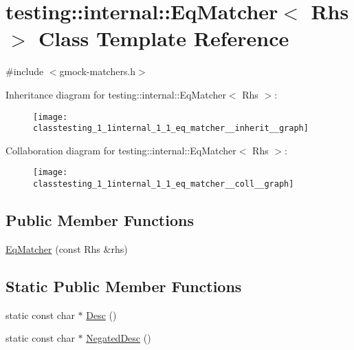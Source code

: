 \hypertarget{classtesting_1_1internal_1_1_eq_matcher}{}\section{testing\+:\+:internal\+:\+:Eq\+Matcher$<$ Rhs $>$ Class Template Reference}
\label{classtesting_1_1internal_1_1_eq_matcher}


{\ttfamily \#include $<$gmock-\/matchers.\+h$>$}



Inheritance diagram for testing\+:\+:internal\+:\+:Eq\+Matcher$<$ Rhs $>$\+:
\nopagebreak
\begin{figure}[H]
\begin{center}
\leavevmode
\texttt{[image: classtesting\_1\_1internal\_1\_1\_eq\_matcher\_\_inherit\_\_graph]}
\end{center}
\end{figure}


Collaboration diagram for testing\+:\+:internal\+:\+:Eq\+Matcher$<$ Rhs $>$\+:
\nopagebreak
\begin{figure}[H]
\begin{center}
\leavevmode
\texttt{[image: classtesting\_1\_1internal\_1\_1\_eq\_matcher\_\_coll\_\_graph]}
\end{center}
\end{figure}
\subsection*{Public Member Functions}
\begin{DoxyCompactItemize}
\item 
\hyperlink{classtesting_1_1internal_1_1_eq_matcher_a9051e33bc31f413a3c958d04cc090b46}{Eq\+Matcher} (const Rhs \&rhs)
\end{DoxyCompactItemize}
\subsection*{Static Public Member Functions}
\begin{DoxyCompactItemize}
\item 
static const char $\ast$ \hyperlink{classtesting_1_1internal_1_1_eq_matcher_a3ddc72ceade061ad56debfa0a4dc2749}{Desc} ()
\item 
static const char $\ast$ \hyperlink{classtesting_1_1internal_1_1_eq_matcher_ae99a542c124694d5b91793a2df9202dc}{Negated\+Desc} ()
\end{DoxyCompactItemize}


